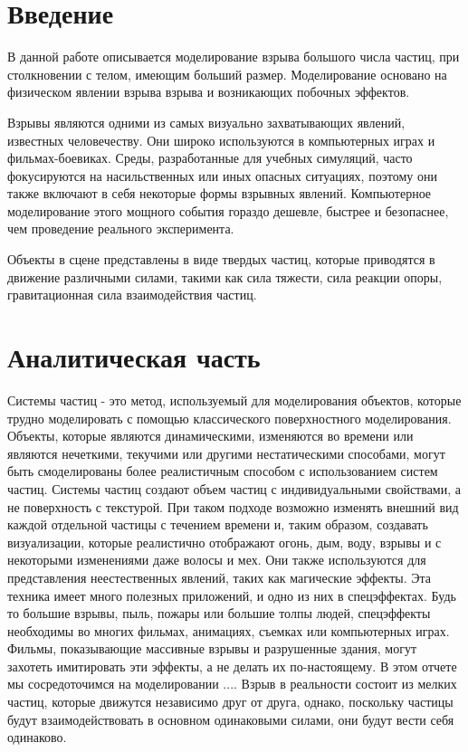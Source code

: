\documentclass[a4paper,14pt]{article} %
\newcommand{\anonsection}[1]{\section*{#1}\addcontentsline{toc}{section}{#1}}
\begin{document}
	\begin{titlepage}
	
	\end{titlepage}
    
	\tableofcontents
	
	\newpage
    
	\anonsection{Введение}
	
	\hfill
	
	В данной работе описывается моделирование взрыва большого числа частиц, при столкновении с телом, имеющим больший размер. Моделирование основано на физическом явлении взрыва взрыва и возникающих побочных эффектов. 
	
	Взрывы являются одними из самых визуально захватывающих явлений, известных человечеству. Они широко используются в компьютерных играх и фильмах-боевиках. Среды, разработанные для учебных симуляций, часто фокусируются на насильственных или иных опасных ситуациях, поэтому они также включают в себя некоторые формы взрывных явлений. Компьютерное моделирование этого мощного события гораздо дешевле, быстрее и безопаснее, чем проведение реального эксперимента. 
	
	Объекты в сцене представлены в виде твердых частиц, которые приводятся в движение различными силами, такими как сила тяжести, сила реакции опоры, гравитационная сила взаимодействия частиц. 
		
	\newpage

	\section{Аналитическая часть}
	
	\hfill
	
	Системы частиц - это метод, используемый для моделирования объектов, которые трудно моделировать с помощью классического поверхностного моделирования. Объекты, которые являются динамическими, изменяются во времени или являются нечеткими, текучими или другими нестатическими способами, могут быть смоделированы более реалистичным способом с использованием систем частиц. Системы частиц создают объем частиц с индивидуальными свойствами, а не поверхность с текстурой. При таком подходе возможно изменять внешний вид каждой отдельной частицы с течением времени и, таким образом, создавать визуализации, которые реалистично отображают огонь, дым, воду, взрывы и с некоторыми изменениями даже волосы и мех. Они также используются для представления неестественных явлений, таких как магические эффекты. 
Эта техника имеет много полезных приложений, и одно из них в спецэффектах. Будь то большие взрывы, пыль, пожары или большие толпы людей, спецэффекты необходимы во многих фильмах, анимациях, съемках или компьютерных играх. Фильмы, показывающие массивные взрывы и разрушенные здания, могут захотеть имитировать эти эффекты, а не делать их по-настоящему. В этом отчете мы сосредоточимся на моделировании .... Взрыв в реальности состоит из мелких частиц, которые движутся независимо друг от друга, однако, поскольку частицы будут взаимодействовать в основном одинаковыми силами, они будут вести себя одинаково.
\end{document}
